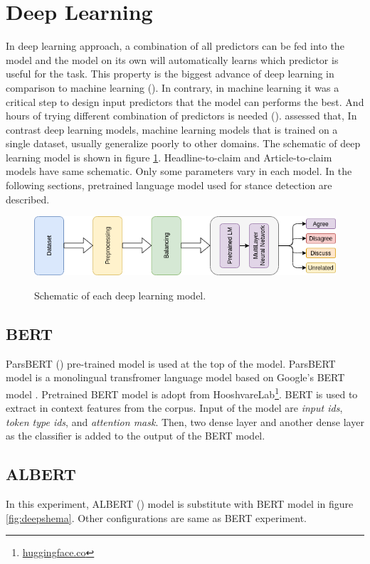 \section{Deep Learning}
In deep learning approach, a combination of all predictors can be fed into the model and the model on its own will automatically learns which predictor is useful for the task. This property is the biggest advance of deep learning in comparison to machine learning (\cite{book_datafake}). In contrary, in machine learning it was a critical step to design input predictors that the model can performs the best. And hours of trying different combination of predictors is needed (\cite{book_fake}). \cite{stance_robust} assessed that, In contrast deep learning models, machine learning models that is trained on a single dataset, usually generalize poorly to other domains.
The schematic of deep learning model is shown in figure \ref{fig:dlschm}. Headline-to-claim and Article-to-claim models have same schematic. Only some parameters vary in each model. In the following sections, pretrained language model used for stance detection are described. 
\begin{figure}%
	\centering
	{\includegraphics[width=14.5cm]{statistics/schema/dl.png} }
	\caption{Schematic of each deep learning model.}%
	\label{fig:dlschm}%
\end{figure}

\subsection{BERT}
ParsBERT (\cite{parsbert}) pre-trained model is used at the top of the model. ParsBERT model is a monolingual transfromer language model based on Google's BERT model \cite{bert}. Pretrained BERT model is adopt from HooshvareLab\footnote{\href{https://huggingface.co/HooshvareLab}{huggingface.co}}. BERT is used to extract in context features from the corpus. Input of the model are \textit{input ids}, \textit{token type ids}, and \textit{attention mask}. Then, two dense layer and another dense layer as the classifier is added to the output of the BERT model. 

\subsection{ALBERT}
In this experiment, ALBERT (\cite{albert})	 model is substitute with BERT model in figure \ref{fig:deepshema}.  Other configurations are same as BERT experiment.

